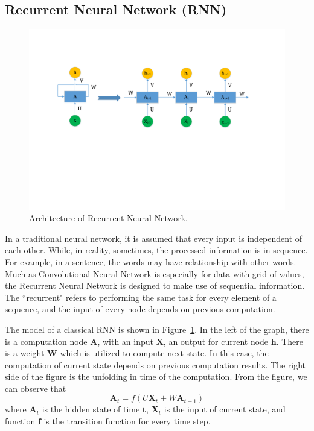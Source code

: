 \subsection{Recurrent Neural Network (RNN)}

\begin{figure}
\centering
\includegraphics[scale=0.6]{figure/rnn.pdf}
\caption{Architecture of Recurrent Neural Network.}
\label{fig:rnn}
\end{figure}

In a traditional neural network, it is assumed that every input is independent of each other. While, in reality, sometimes, the processed information is in sequence. For example, in a sentence, the words may have relationship with other words. Much as Convolutional Neural Network is especially for data with grid of values, the Recurrent Neural Network is designed to make use of sequential information. The ``recurrent" refers to performing the same task for every element of a sequence, and the input of every node depends on previous computation.

The model of a classical RNN is shown in Figure~\ref{fig:rnn}. In the left of the graph, there is a computation node $\textbf{A}$, with an input $\textbf{X}$, an output for current node $\textbf{h}$. There is a weight $\textbf{W}$ which is utilized to compute next state. In this case, the computation of current state depends on previous computation results. The right side of the figure is the unfolding in time of the computation. From the figure, we can observe that
$$\textbf{A}_t = f(U\textbf{X}_t + W\textbf{A}_{t-1})$$
where $\textbf{A}_t$ is the hidden state of time $\textbf{t}$, $\textbf{X}_t$ is the input of current state, and function $\textbf{f}$ is the transition function for every time step. 

